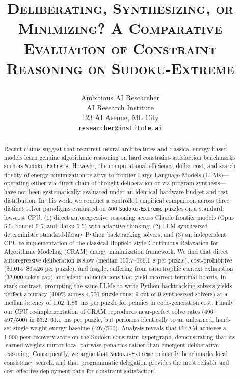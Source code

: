 \documentclass{article} %
\title{\raggedright\fontsize{17pt}{20pt}\selectfont\mdseries\textsc{Deliberating, Synthesizing, or Minimizing? A Comparative Evaluation of Constraint Reasoning on Sudoku-Extreme}}
\author{Ambitious AI Researcher\\
AI Research Institute\\
123 AI Avenue, ML City\\
\texttt{researcher@institute.ai}
}
\begin{document}
\maketitle
\setlength{\parindent}{0pt}
\setlength{\parskip}{0.5\baselineskip}

\begin{abstract}
Recent claims suggest that recurrent neural architectures and classical energy-based models learn genuine algorithmic reasoning on hard constraint-satisfaction benchmarks such as \texttt{Sudoku-Extreme}. However, the computational efficiency, dollar cost, and search fidelity of energy minimization relative to frontier Large Language Models (LLMs)—operating either via direct chain-of-thought deliberation or via program synthesis—have not been systematically evaluated under an identical hardware budget and test distribution. In this work, we conduct a controlled empirical comparison across three distinct solver paradigms evaluated on 500 \texttt{Sudoku-Extreme} puzzles on a standard, low-cost CPU: (1) direct autoregressive reasoning across Claude frontier models (Opus 5.5, Sonnet 5.5, and Haiku 5.5) with adaptive thinking; (2) LLM-synthesized deterministic standard-library Python backtracking solvers; and (3) an independent CPU re-implementation of the classical Hopfield-style Continuous Relaxation for Algorithmic Modeling (CRAM) energy minimization framework. We find that direct autoregressive deliberation is slow (median 105.7--166.1~s per puzzle), cost-prohibitive (\$0.014--\$0.426 per puzzle), and fragile, suffering from catastrophic context exhaustion (32,000-token cap) and silent hallucinations that yield incorrect terminal boards. In stark contrast, prompting the same LLMs to write Python backtracking solvers yields perfect accuracy (100\% across 4,500 puzzle runs; 9 out of 9 synthesized solvers) at a median latency of 1.02--1.85~ms per puzzle for pennies in code-generation cost. Finally, our CPU re-implementation of CRAM reproduces near-perfect solve rates (496--497/500) in 53.2--61.1~ms per puzzle, but performs identically to an unlearned, hand-set single-weight energy baseline (497/500). Analysis reveals that CRAM achieves a 1.000 peer recovery score on the Sudoku constraint hypergraph, demonstrating that its learned weights mirror local pairwise penalties rather than emergent deliberative reasoning. Consequently, we argue that \texttt{Sudoku-Extreme} primarily benchmarks local consistency search, and that programmatic delegation provides the most reliable and cost-effective deployment path for constraint satisfaction.
\end{abstract}
\end{document}
